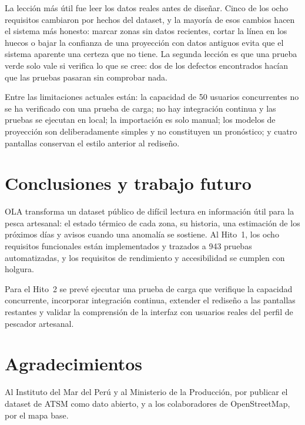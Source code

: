 \documentclass[conference,a4paper]{IEEEtran}
\begin{document}
La lección más útil fue leer los datos reales antes de diseñar. Cinco de los ocho requisitos cambiaron por hechos del dataset, y la mayoría de esos cambios hacen el sistema más honesto: marcar zonas sin datos recientes, cortar la línea en los huecos o bajar la confianza de una proyección con datos antiguos evita que el sistema aparente una certeza que no tiene. La segunda lección es que una prueba verde solo vale si verifica lo que se cree: dos de los defectos encontrados hacían que las pruebas pasaran sin comprobar nada.

Entre las limitaciones actuales están: la capacidad de 50 usuarios concurrentes no se ha verificado con una prueba de carga; no hay integración continua y las pruebas se ejecutan en local; la importación es solo manual; los modelos de proyección son deliberadamente simples y no constituyen un pronóstico; y cuatro pantallas conservan el estilo anterior al rediseño.

\section{Conclusiones y trabajo futuro}\label{sec:concl}

OLA transforma un dataset público de difícil lectura en información útil para la pesca artesanal: el estado térmico de cada zona, su historia, una estimación de los próximos días y avisos cuando una anomalía se sostiene. Al Hito~1, los ocho requisitos funcionales están implementados y trazados a 943 pruebas automatizadas, y los requisitos de rendimiento y accesibilidad se cumplen con holgura.

Para el Hito~2 se prevé ejecutar una prueba de carga que verifique la capacidad concurrente, incorporar integración continua, extender el rediseño a las pantallas restantes y validar la comprensión de la interfaz con usuarios reales del perfil de pescador artesanal.

\section*{Agradecimientos}
Al Instituto del Mar del Perú y al Ministerio de la Producción, por publicar el dataset de ATSM como dato abierto, y a los colaboradores de OpenStreetMap, por el mapa base.



\end{document}
